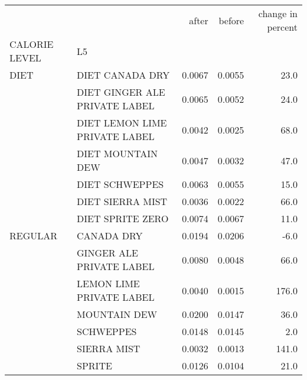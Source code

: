 \begin{tabular}{llrrr}
\toprule
        &        &   after &  before &  change in percent \\
CALORIE LEVEL & L5 &         &         &                    \\
\midrule
DIET & DIET CANADA DRY &  0.0067 &  0.0055 &               23.0 \\
        & DIET GINGER ALE PRIVATE LABEL &  0.0065 &  0.0052 &               24.0 \\
        & DIET LEMON LIME PRIVATE LABEL &  0.0042 &  0.0025 &               68.0 \\
        & DIET MOUNTAIN DEW &  0.0047 &  0.0032 &               47.0 \\
        & DIET SCHWEPPES &  0.0063 &  0.0055 &               15.0 \\
        & DIET SIERRA MIST &  0.0036 &  0.0022 &               66.0 \\
        & DIET SPRITE ZERO &  0.0074 &  0.0067 &               11.0 \\
REGULAR & CANADA DRY &  0.0194 &  0.0206 &               -6.0 \\
        & GINGER ALE PRIVATE LABEL &  0.0080 &  0.0048 &               66.0 \\
        & LEMON LIME PRIVATE LABEL &  0.0040 &  0.0015 &              176.0 \\
        & MOUNTAIN DEW &  0.0200 &  0.0147 &               36.0 \\
        & SCHWEPPES &  0.0148 &  0.0145 &                2.0 \\
        & SIERRA MIST &  0.0032 &  0.0013 &              141.0 \\
        & SPRITE &  0.0126 &  0.0104 &               21.0 \\
\bottomrule
\end{tabular}
